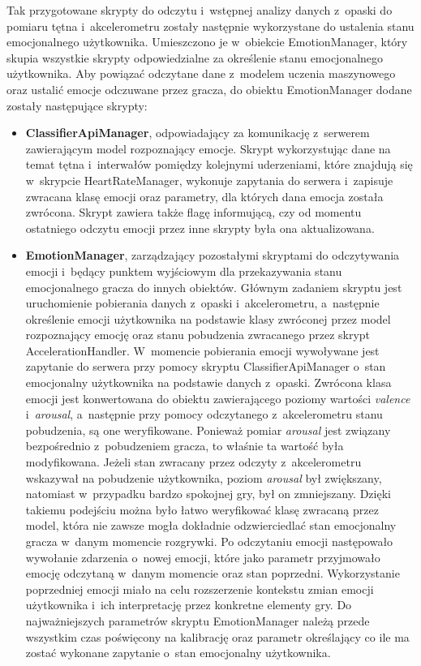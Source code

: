 Tak przygotowane skrypty do odczytu i~wstępnej analizy danych z~opaski do pomiaru tętna i~akcelerometru zostały następnie wykorzystane do ustalenia stanu emocjonalnego użytkownika. Umieszczono je w~obiekcie EmotionManager, który skupia wszystkie skrypty odpowiedzialne za określenie stanu emocjonalnego użytkownika. Aby powiązać odczytane dane z~modelem uczenia maszynowego oraz ustalić emocje odczuwane przez gracza, do obiektu EmotionManager dodane zostały następujące skrypty:
\begin{itemize}
	\item \textbf{ClassifierApiManager}, odpowiadający za komunikację z~serwerem zawierającym model rozpoznający emocje. Skrypt wykorzystując dane na temat tętna i~interwałów pomiędzy kolejnymi uderzeniami, które znajdują się w~skrypcie HeartRateManager, wykonuje zapytania do serwera i~zapisuje zwracana klasę emocji oraz parametry, dla których dana emocja została zwrócona. Skrypt zawiera także flagę informującą, czy od momentu ostatniego odczytu emocji przez inne skrypty była ona aktualizowana.
	\item \textbf{EmotionManager}, zarządzający pozostałymi skryptami do odczytywania emocji i~będący punktem wyjściowym dla przekazywania stanu emocjonalnego gracza do innych obiektów. Głównym zadaniem skryptu jest uruchomienie pobierania danych z~opaski i~akcelerometru, a~następnie określenie emocji użytkownika na podstawie klasy zwróconej przez model rozpoznający emocję oraz stanu pobudzenia zwracanego przez skrypt AccelerationHandler. W~momencie pobierania emocji wywoływane jest zapytanie do serwera przy pomocy skryptu ClassifierApiManager o~stan emocjonalny użytkownika na podstawie danych z~opaski. Zwrócona klasa emocji jest konwertowana do obiektu zawierającego poziomy wartości \textit{valence} i~\textit{arousal}, a~następnie przy pomocy odczytanego z~akcelerometru stanu pobudzenia, są one weryfikowane. Ponieważ pomiar \textit{arousal} jest związany bezpośrednio z~pobudzeniem gracza, to właśnie ta wartość była modyfikowana. Jeżeli stan zwracany przez odczyty z~akcelerometru wskazywał na pobudzenie użytkownika, poziom \textit{arousal} był zwiększany, natomiast w~przypadku bardzo spokojnej gry, był on zmniejszany. Dzięki takiemu podejściu można było łatwo weryfikować klasę zwracaną przez model, która nie zawsze mogła dokładnie odzwierciedlać stan emocjonalny gracza w~danym momencie rozgrywki. Po odczytaniu emocji następowało wywołanie zdarzenia o~nowej emocji, które jako parametr przyjmowało emocję odczytaną w~danym momencie oraz stan poprzedni. Wykorzystanie poprzedniej emocji miało na celu rozszerzenie kontekstu zmian emocji użytkownika i~ich interpretację przez konkretne elementy gry. Do najważniejszych parametrów skryptu EmotionManager należą przede wszystkim czas poświęcony na kalibrację oraz parametr określający co ile ma zostać wykonane zapytanie o~stan emocjonalny użytkownika. 
\end{itemize}

